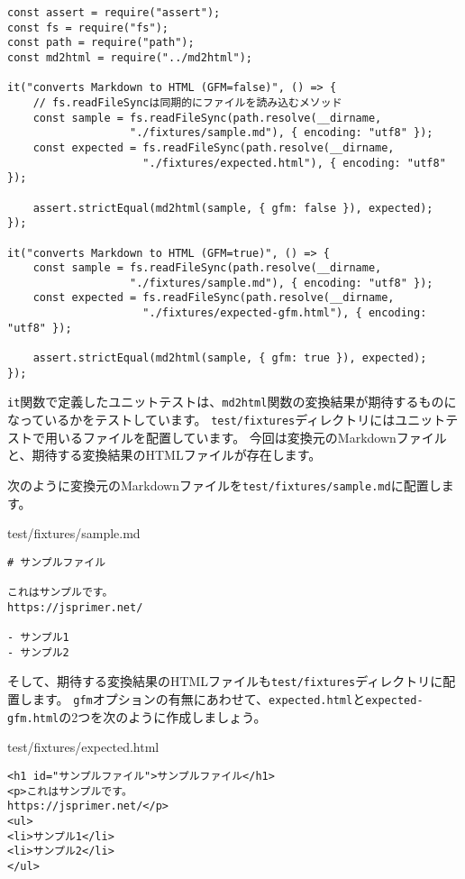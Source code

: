 \begin{lstlisting}
const assert = require("assert");
const fs = require("fs");
const path = require("path");
const md2html = require("../md2html");

it("converts Markdown to HTML (GFM=false)", () => {
    // fs.readFileSyncは同期的にファイルを読み込むメソッド
    const sample = fs.readFileSync(path.resolve(__dirname, 
                   "./fixtures/sample.md"), { encoding: "utf8" });
    const expected = fs.readFileSync(path.resolve(__dirname, 
                     "./fixtures/expected.html"), { encoding: "utf8" });

    assert.strictEqual(md2html(sample, { gfm: false }), expected);
});

it("converts Markdown to HTML (GFM=true)", () => {
    const sample = fs.readFileSync(path.resolve(__dirname, 
                   "./fixtures/sample.md"), { encoding: "utf8" });
    const expected = fs.readFileSync(path.resolve(__dirname, 
                     "./fixtures/expected-gfm.html"), { encoding: "utf8" });

    assert.strictEqual(md2html(sample, { gfm: true }), expected);
});
\end{lstlisting}

\texttt{it}関数で定義したユニットテストは、\texttt{md2html}関数の変換結果が期待するものになっているかをテストしています。
\texttt{test/fixtures}ディレクトリにはユニットテストで用いるファイルを配置しています。
今回は変換元のMarkdownファイルと、期待する変換結果のHTMLファイルが存在します。

次のように変換元のMarkdownファイルを\texttt{test/fixtures/sample.md}に配置します。

\begin{listtitle}
test/fixtures/sample.md
\end{listtitle}
\begin{lstlisting}
# サンプルファイル

これはサンプルです。
https://jsprimer.net/

- サンプル1
- サンプル2
\end{lstlisting}
\listend

そして、期待する変換結果のHTMLファイルも\texttt{test/fixtures}ディレクトリに配置します。
\texttt{gfm}オプションの有無にあわせて、\texttt{expected.html}と\texttt{expected-gfm.html}の2つを次のように作成しましょう。

\begin{listtitle}
test/fixtures/expected.html
\end{listtitle}
\begin{lstlisting}
<h1 id="サンプルファイル">サンプルファイル</h1>
<p>これはサンプルです。
https://jsprimer.net/</p>
<ul>
<li>サンプル1</li>
<li>サンプル2</li>
</ul>
\end{lstlisting}
\listend

